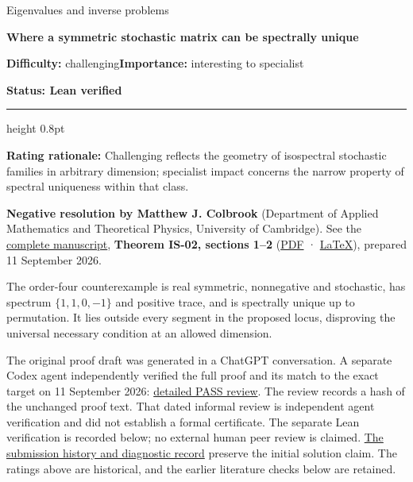 \documentclass[11pt,a4paper]{article}
\makeatletter
\renewcommand{\subsection}{\Needspace{4\baselineskip}\@startsection{subsection}{2}{0pt}{9pt plus 1pt minus 1pt}{3pt}{\sffamily\bfseries\normalsize\color{ink}}}
\makeatother
\begin{document}
{\sffamily\small\color{muted}Eigenvalues and inverse problems\par}
\vspace{3pt}
{\raggedright{}\sffamily\bfseries\fontsize{21}{24}\selectfont\color{ink}Where
a symmetric stochastic matrix can be spectrally unique\par}
\vspace{7pt}
{\sffamily\small\textbf{Difficulty:} challenging\quad\textbf{Importance:} interesting
to specialist\par}
{\sffamily\small\bfseries\color{accent}Status: Lean verified\par}
\vspace{4pt}
{\color{accent}\hrule height 0.8pt}
\vspace{6pt}
\textbf{Rating rationale:} Challenging reflects the geometry of
isospectral stochastic families in arbitrary dimension; specialist
impact concerns the narrow property of spectral uniqueness within that
class.

\subsection{Resolution --- 2026-09-11}\label{resolution-2026-09-11}

\textbf{Negative resolution by Matthew J. Colbrook} (Department of
Applied Mathematics and Theoretical Physics, University of Cambridge).
See the
\href{https://github.com/ajt60gaibb/OpenProblemsInNLA/blob/main/eigenvalues-and-inverse-problems/IS-02/solution.md}{complete
manuscript}, \textbf{Theorem IS-02, sections 1--2}
(\href{https://github.com/ajt60gaibb/OpenProblemsInNLA/blob/main/eigenvalues-and-inverse-problems/IS-02/solution.pdf}{PDF}
·
\href{https://github.com/ajt60gaibb/OpenProblemsInNLA/blob/main/eigenvalues-and-inverse-problems/IS-02/solution.tex}{LaTeX}),
prepared 11 September 2026.

The order-four counterexample is real symmetric, nonnegative and
stochastic, has spectrum \(\{1,1,0,-1\}\) and positive trace, and is
spectrally unique up to permutation. It lies outside every segment in
the proposed locus, disproving the universal necessary condition at an
allowed dimension.

The original proof draft was generated in a ChatGPT conversation. A
separate Codex agent independently verified the full proof and its match
to the exact target on 11 September 2026:
\href{https://github.com/ajt60gaibb/OpenProblemsInNLA/blob/main/references/colbrook-2026-09-11/verification/reviews/IS-02-review.md}{detailed
PASS review}. The review records a hash of the unchanged proof text.
That dated informal review is independent agent verification and did not
establish a formal certificate. The separate Lean verification is
recorded below; no external human peer review is claimed.
\href{https://github.com/ajt60gaibb/OpenProblemsInNLA/blob/main/references/colbrook-2026-09-11/README.md}{The
submission history and diagnostic record} preserve the initial solution
claim. The ratings above are historical, and the earlier literature
checks below are retained.
\end{document}
